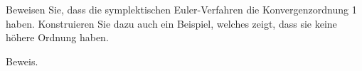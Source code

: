 \begin{exercise}
  Beweisen Sie, dass die symplektischen Euler-Verfahren die Konvergenzordnung 1
  haben. Konstruieren Sie dazu auch ein Beispiel, welches zeigt, dass sie keine
  höhere Ordnung haben.
\end{exercise}

\begin{solution}
Beweis.
\end{solution}
